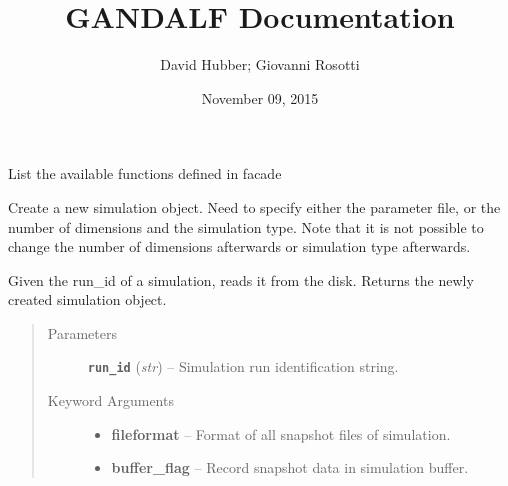 \documentclass[letterpaper,10pt,english]{sphinxmanual}
\title{GANDALF Documentation}
\date{November 09, 2015}
\author{David Hubber; Giovanni Rosotti}
\begin{document}
\maketitle
\tableofcontents
{}\label{index::doc}\label{index:module-facade}

\begin{fulllineitems}
\label{index:facade.ListFunctions}
List the available functions defined in facade

\end{fulllineitems}


\begin{fulllineitems}
\label{index:facade.newsim}
Create a new simulation object. Need to specify either the parameter
file, or the number of dimensions and the simulation type. Note that it is not
possible to change the number of dimensions afterwards or simulation type
afterwards.

\end{fulllineitems}


\begin{fulllineitems}
\label{index:facade.loadsim}
Given the run\_id of a simulation, reads it from the disk.
Returns the newly created simulation object.
\begin{quote}\begin{description}
\item[{Parameters}] \leavevmode
\textbf{\texttt{run\_id}} (\emph{str}) -- Simulation run identification string.

\item[{Keyword Arguments}] \leavevmode\begin{itemize}
\item {} 
\textbf{fileformat} --
Format of all snapshot files of simulation.

\item {} 
\textbf{buffer\_flag} --
Record snapshot data in simulation buffer.

\end{itemize}

\end{description}\end{quote}

\end{fulllineitems}
\end{document}
